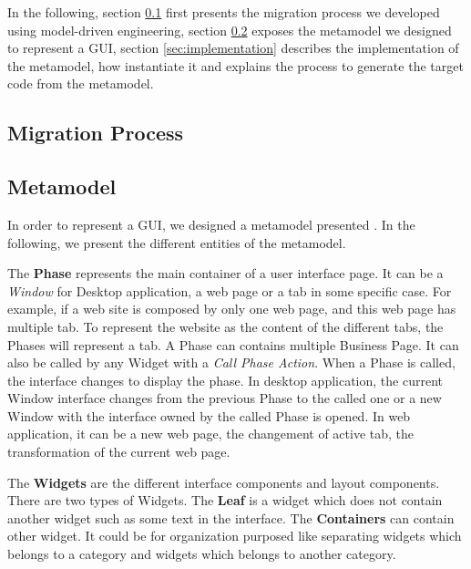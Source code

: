 \documentclass[conference]{IEEEtran}
\begin{document}
    In the following, section \ref{sec:migrationProcess} first presents the migration process we developed using model-driven engineering,
    section \ref{sec:metamodel} exposes the metamodel we designed to represent a GUI,
    section \ref{sec:implementation} describes the implementation of the metamodel, 
        how instantiate it and
        explains the process to generate the target code from the metamodel.

    \subsection{Migration Process}
    \label{sec:migrationProcess}

    
    \subsection{Metamodel}
    \label{sec:metamodel}

    In order to represent a GUI, we designed a metamodel presented .
    In the following, we present the different entities of the metamodel.


    The \textbf{Phase} represents the main container of a user interface page.
    It can be a \textit{Window} for Desktop application,
        a web page or a tab in some specific case.
    For example, 
        if a web site is composed by only one web page, 
        and this web page has multiple tab.
    To represent the website as the content of the different tabs, 
        the Phases will represent a tab.
    A Phase can contains multiple Business Page.
    It can also be called by any Widget with a \textit{Call Phase Action}.
    When a Phase is called, the interface changes to display the phase.
    In desktop application, the current Window interface changes from the previous Phase to 
        the called one or a new Window with the interface owned by the called Phase is opened.
    In web application, it can be a new web page, the changement of active tab, the transformation of the current web page. 

    The \textbf{Widgets} are the different interface components and layout components.
    There are two types of Widgets.
    The \textbf{Leaf} is a widget which does not contain another widget such as some text in the interface. 
    The \textbf{Containers} can contain other widget. 
    It could be for organization purposed like separating widgets which belongs to a category and widgets which belongs to another category.
    
\end{document}
